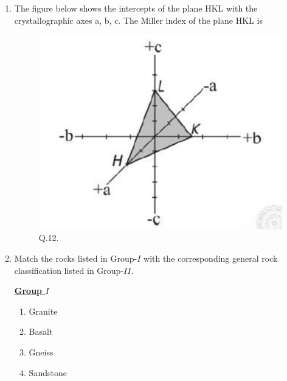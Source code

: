 \documentclass[journal,12pt,onecolumn]{IEEEtran}
\theoremstyle{remark}
\begin{document}
\begin{enumerate}
    \item The figure below shows the intercepts of the plane HKL with the crystallographic axes a, b, c. The Miller index of the plane HKL is \hfill{}
        \begin{figure}[h]
            \centering
            \includegraphics[width=0.5\columnwidth]{Figs/fig_3.png}
            \caption{Q.12.}
            \label{fig:placeholder_3}
        \end{figure}
        \begin{enumerate} 
        \end{enumerate}    
    
    \item Match the rocks listed in Group-$I$ with the corresponding general rock classification listed in Group-$II$. \hfill{}
        \begin{multicols}{2}
            \underline{\textbf{Group $I$}}
            \begin{enumerate}[start=16]
                \item Granite
                \item Basalt
                \item Gneiss
                \item Sandstone
            \end{enumerate}
            
            \columnbreak
            

\end{multicols}
\end{enumerate}
\end{document}
